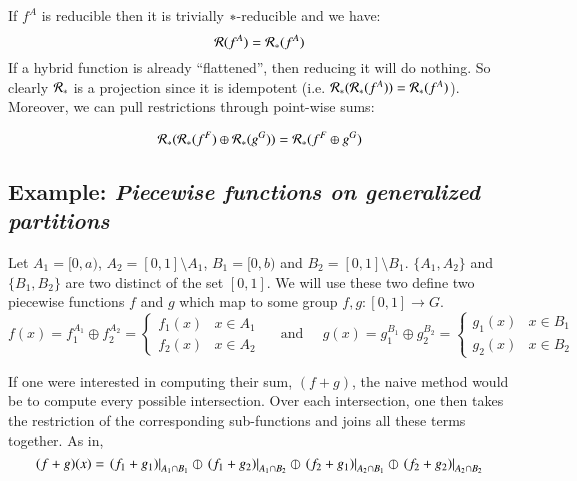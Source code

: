 If $f^A$ is reducible then it is trivially $*$-reducible and we have:
\begin{equation}
	\mathcal{R}(f^A) = \mathcal{R}_*(f^A)
\end{equation}
If a hybrid function is already ``flattened'', then reducing it will do nothing.
So clearly $\mathcal{R}_*$ is a projection since it is idempotent  (i.e. $\mathcal{R}_* ( \mathcal{R}_*( f^A)) = \mathcal{R}_*(f^A)$).
Moreover, we can pull restrictions through point-wise sums:

\begin{equation}
	\mathcal{R}_*( \mathcal{R}_*(f^F) \oplus \mathcal{R}_*(g^G)) =\mathcal{R}_*( f^F \oplus g^G)
\end{equation}



\subsection{Example: \emph{Piecewise functions on generalized partitions}} 

Let $A_1 = [0,a)$, $A_2 = [0,1] \setminus A_1$, $B_1 = [0,b)$ and $B_2 = [0,1] \setminus B_1$.
$\{ A_1, A_2\}$ and $\{B_1, B_2\}$ are two distinct of the set $[0,1]$.
We will use these two define two piecewise functions $f$ and $g$ which map to some group $f,g:[0,1] \to G$.
\begin{equation*}
	f(x) = f_1^{A_1} \oplus f_2^{A_2}
		= \begin{cases}
			f_1(x) & x \in A_1 \\
			f_2(x) & x \in A_2
		\end{cases}
	\;\;\;\;\; \text{and} \;\;\;\;\;
	g(x) = g_1^{B_1} \oplus g_2^{B_2}
		= \begin{cases}
			g_1(x) & x \in B_1 \\
			g_2(x) & x \in B_2
		\end{cases}
\end{equation*}

If one were interested in computing their sum, $(f+g)$, the naive method would be to compute every possible intersection.
Over each intersection, one then takes the restriction of the corresponding sub-functions and joins all these terms together.
As in,
\begin{equation*}
	(f+g)(x) = \left.(f_1 + g_1)\right|_{A_1 \cap B_1} 
		\varobar \left.(f_1 + g_2)\right|_{A_1 \cap B_2} 
		\varobar \left.(f_2 + g_1)\right|_{A_2 \cap B_1}
		\varobar \left.(f_2 + g_2)\right|_{A_2 \cap B_2}
\end{equation*}

